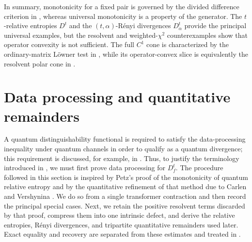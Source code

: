 \documentclass[11pt]{article}
\theoremstyle{remark}
\newcommand{\1}{\mathbbm{1}}
\begin{document}
In summary, monotonicity for a fixed pair is governed by the divided
difference criterion in
, whereas universal
monotonicity is a property of the generator.  The $t$-relative
entropies $D^t$ and the $(t,\alpha)$-R\'enyi divergences
$D_\alpha^t$ provide the principal universal examples, but the
resolvent and weighted-$\chi^2$ counterexamples show that operator
convexity is not sufficient.  The full \(C^1\) cone is characterized
by the ordinary-matrix L\"owner test in
, while its
operator-convex slice is equivalently the resolvent polar cone in
.


\section{Data processing and quantitative remainders}
\label{sec:consolidated-dpi}

A quantum distinguishability functional is required to satisfy the
data-processing inequality under quantum channels in order to qualify
as a quantum divergence; this requirement is discussed, for example, in
\cite[Section~1]{hiai2017different}.  Thus, to justify the terminology
introduced in , we must first
prove data processing for \(D_f^t\).  The procedure followed in this
section is inspired by Petz's proof of the monotonicity of quantum
relative entropy \cite{petz2003monotonicity} and by the quantitative
refinement of that method due to Carlen and Vershynina
\cite{carlen2018recovery}.  We do so from a single transformer
contraction and then record the principal special cases.
Next, we retain the positive resolvent terms discarded by that proof,
compress them into one intrinsic defect, and derive the relative entropies,
R\'enyi divergences, and tripartite quantitative remainders used later.  Exact
equality and recovery are separated from these estimates and treated
in .
\end{document}
